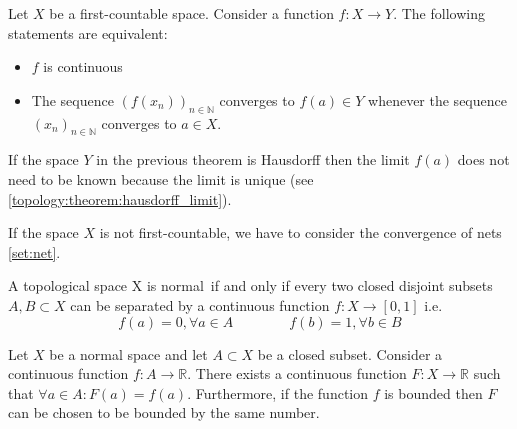 	\begin{theorem}
    		Let $X$ be a first-countable space. Consider a function $f:X\rightarrow Y$. The following statements are equivalent:
        	\begin{itemize}
        		\item $f$ is continuous
        		\item The sequence $(f(x_n))_{n\in\mathbb{N}}$ converges to $f(a)\in Y$ whenever the sequence $(x_n)_{n\in\mathbb{N}}$ converges to $a\in X$.
	        \end{itemize}
	\end{theorem}
	\begin{result}
	   	If the space $Y$ in the previous theorem is Hausdorff then the limit $f(a)$ does not need to be known because the limit is unique (see \ref{topology:theorem:hausdorff_limit}).
	\end{result}
	\begin{remark}
    		If the space $X$ is not first-countable, we have to consider the convergence of nets \ref{set:net}.
	\end{remark}
    
	\begin{theorem}
    		A topological space X is normal\footnotemark\ if and only if every two closed disjoint subsets $A, B\subset X$ can be separated by a continuous function $f:X\rightarrow [0, 1]$ i.e.
	    	\begin{equation}
    			\label{topology:urysohns_lemma}
    			f(a) = 0, \forall a\in A\qquad\qquad f(b) = 1, \forall b\in B
    		\end{equation}
	\end{theorem}
	
	\begin{theorem}
		Let $X$ be a normal space and let $A\subset X$ be a closed subset. Consider a continuous function $f:A\rightarrow\mathbb{R}$. There exists a continuous function $F:X\rightarrow\mathbb{R}$ such that $\forall a\in A: F(a) = f(a)$. Furthermore, if the function $f$ is bounded then $F$ can be chosen to be bounded by the same number.
	\end{theorem}
    
